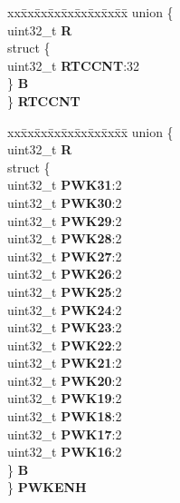 \begin{DoxyCompactItemize}
\begin{tabbing}
\end{tabbing}\item 
\mbox{\label{structCRP__tag_aa68964da87a54ea2ccbf0092a0f68027}} 
\begin{tabbing}
xx\=xx\=xx\=xx\=xx\=xx\=xx\=xx\=xx\=\kill
union \{\\
\>uint32\_t {\bfseries R}\\
\>struct \{\\
\>\>uint32\_t {\bfseries RTCCNT}:32\\
\>\} {\bfseries B}\\
\} {\bfseries RTCCNT}\\

\end{tabbing}\item 
\mbox{\label{structCRP__tag_a529ee0e46aeb3075e70394d35979ad4a}} 
\begin{tabbing}
xx\=xx\=xx\=xx\=xx\=xx\=xx\=xx\=xx\=\kill
union \{\\
\>uint32\_t {\bfseries R}\\
\>struct \{\\
\>\>uint32\_t {\bfseries PWK31}:2\\
\>\>uint32\_t {\bfseries PWK30}:2\\
\>\>uint32\_t {\bfseries PWK29}:2\\
\>\>uint32\_t {\bfseries PWK28}:2\\
\>\>uint32\_t {\bfseries PWK27}:2\\
\>\>uint32\_t {\bfseries PWK26}:2\\
\>\>uint32\_t {\bfseries PWK25}:2\\
\>\>uint32\_t {\bfseries PWK24}:2\\
\>\>uint32\_t {\bfseries PWK23}:2\\
\>\>uint32\_t {\bfseries PWK22}:2\\
\>\>uint32\_t {\bfseries PWK21}:2\\
\>\>uint32\_t {\bfseries PWK20}:2\\
\>\>uint32\_t {\bfseries PWK19}:2\\
\>\>uint32\_t {\bfseries PWK18}:2\\
\>\>uint32\_t {\bfseries PWK17}:2\\
\>\>uint32\_t {\bfseries PWK16}:2\\
\>\} {\bfseries B}\\
\} {\bfseries PWKENH}\\


\end{tabbing}
\end{DoxyCompactItemize}
